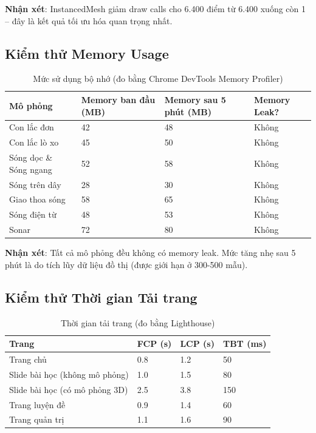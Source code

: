 \textbf{Nhận xét}: InstancedMesh giảm draw calls cho 6.400 điểm từ 6.400 xuống còn 1 – đây là kết quả tối ưu hóa quan trọng nhất.

\subsection{Kiểm thử Memory Usage}

\begin{table}[H]
\centering
\caption{Mức sử dụng bộ nhớ (đo bằng Chrome DevTools Memory Profiler)}
\begin{tabular}{|p{}|p{}|p{}|p{}|}
\hline
\textbf{Mô phỏng} & \textbf{Memory ban đầu (MB)} & \textbf{Memory sau 5 phút (MB)} & \textbf{Memory Leak?} \\
\hline
Con lắc đơn & 42 & 48 & Không \\
\hline
Con lắc lò xo & 45 & 50 & Không \\
\hline
Sóng dọc \& Sóng ngang & 52 & 58 & Không \\
\hline
Sóng trên dây & 28 & 30 & Không \\
\hline
Giao thoa sóng & 58 & 65 & Không \\
\hline
Sóng điện từ & 48 & 53 & Không \\
\hline
Sonar & 72 & 80 & Không \\
\hline
\end{tabular}
\end{table}

\textbf{Nhận xét}: Tất cả mô phỏng đều không có memory leak. Mức tăng nhẹ sau 5 phút là do tích lũy dữ liệu đồ thị (được giới hạn ở 300-500 mẫu).

\subsection{Kiểm thử Thời gian Tải trang}

\begin{table}[H]
\centering
\caption{Thời gian tải trang (đo bằng Lighthouse)}
\begin{tabular}{|p{}|p{}|p{}|p{}|}
\hline
\textbf{Trang} & \textbf{FCP (s)} & \textbf{LCP (s)} & \textbf{TBT (ms)} \\
\hline
Trang chủ & 0.8 & 1.2 & 50 \\
\hline
Slide bài học (không mô phỏng) & 1.0 & 1.5 & 80 \\
\hline
Slide bài học (có mô phỏng 3D) & 2.5 & 3.8 & 150 \\
\hline
Trang luyện đề & 0.9 & 1.4 & 60 \\
\hline
Trang quản trị & 1.1 & 1.6 & 90 \\
\hline
\end{tabular}
\end{table}

